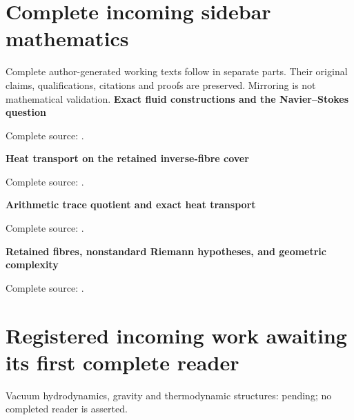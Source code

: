 \documentclass[11pt,a4paper]{article}
\begin{document}
\section*{Complete incoming sidebar mathematics}
Complete author-generated working texts follow in separate parts. Their original claims, qualifications, citations and proofs are preserved. Mirroring is not mathematical validation.
\tableofcontents
\bigskip
\noindent\textbf{Exact fluid constructions and the Navier--Stokes question}\par
\noindent Complete source: .\par\medskip
\noindent\textbf{Heat transport on the retained inverse-fibre cover}\par
\noindent Complete source: .\par\medskip
\noindent\textbf{Arithmetic trace quotient and exact heat transport}\par
\noindent Complete source: .\par\medskip
\noindent\textbf{Retained fibres, nonstandard Riemann hypotheses, and geometric complexity}\par
\noindent Complete source: .\par\medskip




\section*{Registered incoming work awaiting its first complete reader}
Vacuum hydrodynamics, gravity and thermodynamic structures: pending; no completed reader is asserted.\par
\end{document}
